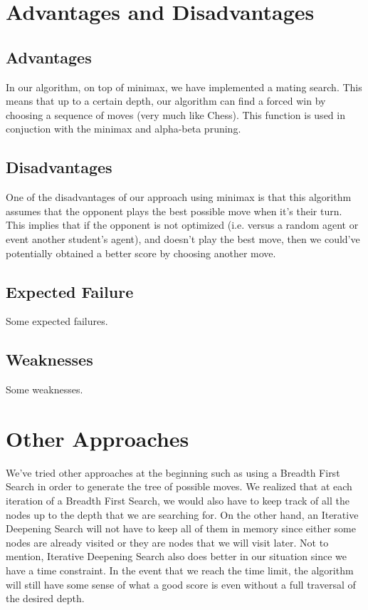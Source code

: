 \documentclass[12pt,a4paper]{article}
\begin{document}
\section{Advantages and Disadvantages}
\subsection{Advantages}
In our algorithm, on top of minimax, we have implemented a mating search. This means that up to a certain depth, 
our algorithm can find a forced win by choosing a sequence of moves (very much like Chess). This function is used 
in conjuction with the minimax and alpha-beta pruning. 
\subsection{Disadvantages}
One of the disadvantages of our approach using minimax is that this algorithm assumes that the opponent plays 
the best possible move when it's their turn. This implies that if the opponent is not optimized (i.e. versus a 
random agent or event another student's agent), and doesn't play the best move, then we could've potentially 
obtained a better score by choosing another move. 
\subsection{Expected Failure}
Some expected failures. 
\subsection{Weaknesses}
Some weaknesses. 

\section{Other Approaches}
We've tried other approaches at the beginning such as using a Breadth First Search in order to generate the 
tree of possible moves. We realized that at each iteration of a Breadth First Search, 
we would also have to keep track of 
all the nodes up to the depth that we are searching for. On the other hand, an Iterative Deepening Search will not 
have to keep all of them in memory since either some nodes are already visited or they are nodes that we will 
visit later. Not to mention, Iterative Deepening Search also does better in our situation since we have a time 
constraint. In the event that we reach the time limit, the algorithm will still 
have some sense of what a good score is even without 
a full traversal of the desired depth. 
\end{document}
